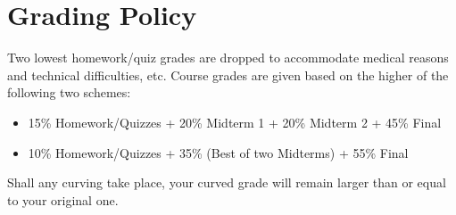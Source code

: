\documentclass[11pt]{article}
\begin{document}
\section*{Grading Policy}
Two lowest homework/quiz grades are dropped to accommodate medical reasons and technical difficulties, etc. Course grades are given based on the higher of the following two schemes:
\begin{itemize}
  \item 15\% Homework/Quizzes + 20\% Midterm 1 + 20\% Midterm 2 + 45\% Final
  \item 10\% Homework/Quizzes + 35\% (Best of two Midterms) + 55\% Final
\end{itemize}
Shall any curving take place, your curved grade will remain larger than or equal to your original one.
\end{document}
